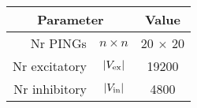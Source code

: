 \begin{tabular}{rcc}
\hline
\multicolumn{2}{c}{\textbf{Parameter}} &  \textbf{Value} 
\\ \hline
Nr PINGs & \textbf{${n \times n}$} & 20 $\times$ 20
\\ 
Nr excitatory & \textbf{${|V_{\mathrm{ex}}|}$} & 19200
\\ 
Nr inhibitory & \textbf{${|V_{\mathrm{in}}|}$} & 4800
\\ \hline
\end{tabular}